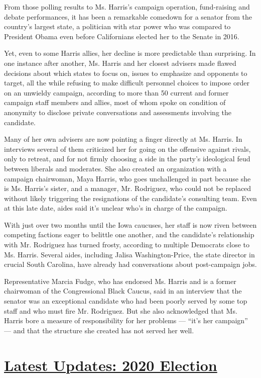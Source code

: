 From those polling results to Ms. Harris's campaign operation,
fund-raising and debate performances, it has been a remarkable comedown
for a senator from the country's largest state, a politician with star
power who was compared to President Obama even before Californians
elected her to the Senate in 2016.

Yet, even to some Harris allies, her decline is more predictable than
surprising. In one instance after another, Ms. Harris and her closest
advisers made flawed decisions about which states to focus on, issues to
emphasize and opponents to target, all the while refusing to make
difficult personnel choices to impose order on an unwieldy campaign,
according to more than 50 current and former campaign staff members and
allies, most of whom spoke on condition of anonymity to disclose private
conversations and assessments involving the candidate.

Many of her own advisers are now pointing a finger directly at Ms.
Harris. In interviews several of them criticized her for going on the
offensive against rivals, only to retreat, and for not firmly choosing a
side in the party's ideological feud between liberals and moderates. She
also created an organization with a campaign chairwoman, Maya Harris,
who goes unchallenged in part because she is Ms. Harris's sister, and a
manager, Mr. Rodriguez, who could not be replaced without likely
triggering the resignations of the candidate's consulting team. Even at
this late date, aides said it's unclear who's in charge of the campaign.

With just over two months until the Iowa caucuses, her staff is now
riven between competing factions eager to belittle one another, and the
candidate's relationship with Mr. Rodriguez has turned frosty, according
to multiple Democrats close to Ms. Harris. Several aides, including
Jalisa Washington-Price, the state director in crucial South Carolina,
have already had conversations about post-campaign jobs.

Representative Marcia Fudge, who has endorsed Ms. Harris and is a former
chairwoman of the Congressional Black Caucus, said in an interview that
the senator was an exceptional candidate who had been poorly served by
some top staff and who must fire Mr. Rodriguez. But she also
acknowledged that Ms. Harris bore a measure of responsibility for her
problems --- ``it's her campaign'' --- and that the structure she
created has not served her well.

\hypertarget{latest-updates-2020-election}{%
\section{\texorpdfstring{\href{https://www.nytimes.com/2020/07/31/us/elections/biden-vs-trump.html?action=click\&pgtype=Article\&state=default\&region=MAIN_CONTENT_1\&context=storylines_live_updates}{Latest
Updates: 2020
Election}}{Latest Updates: 2020 Election}}\label{latest-updates-2020-election}}

